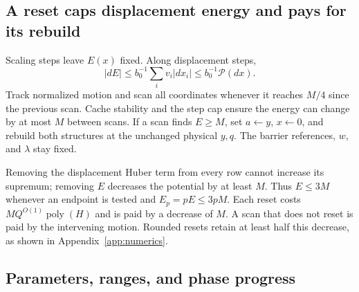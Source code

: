 \documentclass[11pt]{article}
\theoremstyle{definition}\newtheorem{definition}[theorem]{Definition}
\theoremstyle{remark}\newtheorem{remark}[theorem]{Remark}
\newcommand{\poly}{\operatorname{poly}}
\begin{document}
\subsection{A reset caps displacement energy and pays for its rebuild}

Scaling steps leave $E(x)$ fixed. Along displacement steps,
\[
 |dE|\le b_0^{-1}\sum_i v_i|dx_i|\le b_0^{-1}\mathcal P(dx).
\]
Track normalized motion and scan all coordinates whenever it reaches
$M/4$ since the previous scan. Cache stability and the step cap ensure
the energy can change by at most $M$ between scans. If a scan finds
$E\ge M$, set $a\leftarrow y$, $x\leftarrow0$, and rebuild both
structures at the unchanged physical $y,q$. The barrier references,
$w$, and $\lambda$ stay fixed.

Removing the displacement Huber term from every row cannot increase
its supremum; removing $E$ decreases the potential by at least $M$.
Thus $E\le3M$ whenever an endpoint is tested and
$E_p=pE\le3pM$. Each reset costs $MQ^{O(1)}\poly(H)$ and is paid
by a decrease of $M$. A scan that does not reset is paid by the
intervening motion. Rounded resets retain at least half this decrease,
as shown in Appendix~\ref{app:numerics}.

\subsection{Parameters, ranges, and phase progress}
\end{document}
